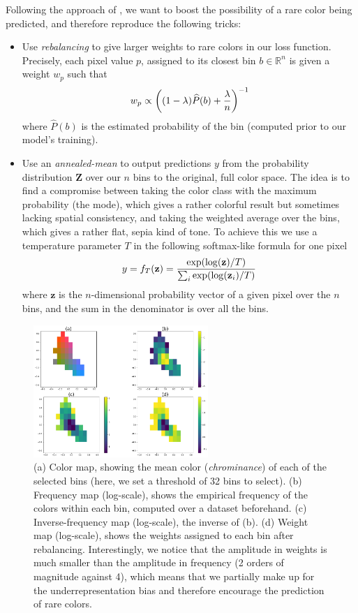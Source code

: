 \documentclass[10pt,twocolumn,letterpaper]{article}
\begin{document}
Following the approach of \cite{zhang2016colorful}, we want to boost the possibility of a rare color being predicted, and therefore reproduce the following tricks:
\begin{itemize}
\item Use \textit{rebalancing} to give larger weights to rare colors in our loss function. Precisely, each pixel value $p$, assigned to its closest bin $b \in \mathbb{R}^n$ is given a weight $w_p$ such that $$w_p \propto \left( (1-\lambda) \widehat{P}(b) + {\lambda \over n} \right)^{-1}$$ where $\widehat{P}(b)$ is the estimated probability of the bin (computed prior to our model's training).
\item Use an \textit{annealed-mean} to output predictions $y$ from the probability distribution $\textbf{Z}$ over our $n$ bins to the original, full color space. The idea is to find a compromise between taking the color class with the maximum probability (the mode), which gives a rather colorful result but sometimes lacking spatial consistency, and taking the weighted average over the bins, which gives a rather flat, sepia kind of tone. To achieve this we use a temperature parameter $T$ in the following softmax-like formula for one pixel $$y = f_T(\textbf{z}) = {\exp(\log(\textbf{z}) / T) \over \sum_i \exp(\log(\textbf{z}_i) / T)}$$ where $\textbf{z}$ is the $n$-dimensional probability vector of a given pixel over the $n$ bins, and the sum in the denominator is over all the bins. 
\end{itemize}

\begin{figure}
\begin{center}
\includegraphics[width=250px]{img/cdexample.png}
\caption{(a) Color map, showing the mean color (\textit{chrominance}) of each of the selected bins (here, we set a threshold of 32 bins to select). (b) Frequency map (log-scale), shows the empirical frequency of the colors within each bin, computed over a dataset beforehand. (c) Inverse-frequency map (log-scale), \ie the inverse of (b). (d) Weight map (log-scale), shows the weights assigned to each bin after rebalancing. Interestingly, we notice that the amplitude in weights is much smaller than the amplitude in frequency (2 orders of magnitude against 4), which means that we partially make up for the underrepresentation bias and therefore encourage the prediction of rare colors.}
\label{cdex}
\end{center}
\end{figure}
\end{document}
